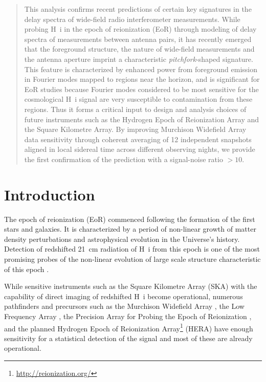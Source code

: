 \documentclass[preprint2,apjl,numberedappendix,twocolappendix,appendixfloats]{emulateapj}
\begin{document}


\begin{abstract}

This analysis confirms recent predictions of certain key signatures in the delay spectra of wide-field radio interferometer measurements. While probing H~{\sc i} in the epoch of reionization (EoR) through modeling of delay spectra of measurements between antenna pairs, it has recently emerged that the foreground structure, the nature of wide-field measurements and the antenna aperture imprint a characteristic {\it pitchfork}-shaped signature. This feature is characterized by enhanced power from foreground emission in Fourier modes mapped to regions near the horizon, and is significant for EoR studies because Fourier modes considered to be most sensitive for the cosmological H~{\sc i} signal are very susceptible to contamination from these regions. Thus it forms a critical input to design and analysis choices of future instruments such as the Hydrogen Epoch of Reionization Array and the Square Kilometre Array. By improving Murchison Widefield Array data sensitivity through coherent averaging of 12 independent snapshots aligned in local sidereal time across different observing nights, we provide the first confirmation of the prediction with a signal-noise ratio $>10$. 

\end{abstract}
 

\section{Introduction}\label{sec:intro}

The epoch of reionization (EoR) commenced following the formation of the first stars and galaxies. It is characterized by a period of non-linear growth of matter density perturbations and astrophysical evolution in the Universe's history. Detection of redshifted 21~cm radiation of H~{\sc i} from this epoch is one of the most promising probes of the non-linear evolution of large scale structure characteristic of this epoch \citep{sun72,sco90,mad97,toz00,ili02}.

While sensitive instruments such as the Square Kilometre Array (SKA) with the capability of direct imaging of redshifted H~{\sc i} become operational, numerous pathfinders and precursors such as the Murchison Widefield Array \citep[MWA;][]{lon09,tin13,bow13}, the Low Frequency Array \citep[LOFAR;][]{van13}, the Precision Array for Probing the Epoch of Reionization \citep[PAPER;][]{par10}, and the planned Hydrogen Epoch of Reionization Array\footnote{\url{http://reionization.org/}} (HERA) have enough sensitivity for a statistical detection of the signal \citep{bow06,par12a,bea13,dil13,thy13,pob14} and most of these are already operational.
\end{document}
